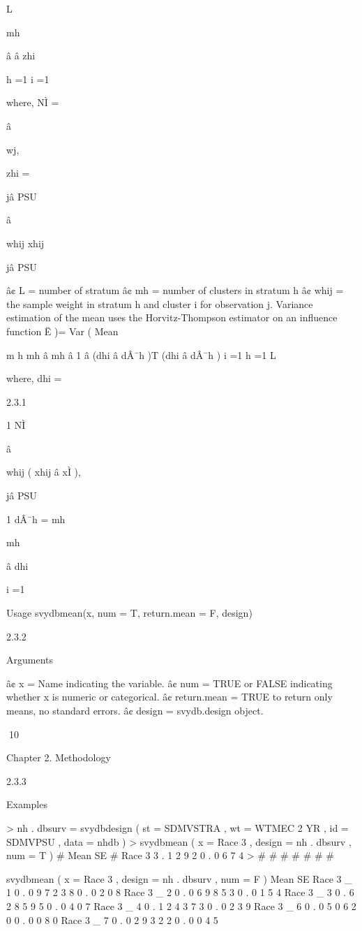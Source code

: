 L

mh

â â zhi

h =1 i =1

where,
NÌ =

â

wj,

zhi =

jâ PSU

â

whij xhij

jâ PSU

â¢ L = number of stratum
â¢ mh = number of clusters in stratum h
â¢ whij = the sample weight in stratum h and cluster i for observation j.
Variance estimation of the mean uses the Horvitz-Thompson estimator on an influence function
Ë )=
Var ( Mean

m h mh
â mh â 1 â (dhi â dÂ¯h )T (dhi â dÂ¯h )
i =1
h =1
L

where,
dhi =

2.3.1

1
NÌ

â

whij ( xhij â xÌ ),

jâ PSU

1
dÂ¯h =
mh

mh

â dhi

i =1

Usage
svydbmean(x, num = T, return.mean = F, design)

2.3.2

Arguments

â¢ x = Name indicating the variable.
â¢ num = TRUE or FALSE indicating whether x is numeric or categorical.
â¢ return.mean = TRUE to return only means, no standard errors.
â¢ design = svydb.design object.

10

Chapter 2. Methodology

2.3.3

Examples

> nh . dbsurv = svydbdesign ( st = SDMVSTRA , wt = WTMEC 2 YR ,
id = SDMVPSU , data = nhdb )
> svydbmean ( x = Race 3 , design = nh . dbsurv , num = T )
#
Mean
SE
# Race 3 3 . 1 2 9 2 0 . 0 6 7 4
>
#
#
#
#
#
#
#

svydbmean ( x = Race 3 , design = nh . dbsurv , num = F )
Mean
SE
Race 3 _ 1 0 . 0 9 7 2 3 8 0 . 0 2 0 8
Race 3 _ 2 0 . 0 6 9 8 5 3 0 . 0 1 5 4
Race 3 _ 3 0 . 6 2 8 5 9 5 0 . 0 4 0 7
Race 3 _ 4 0 . 1 2 4 3 7 3 0 . 0 2 3 9
Race 3 _ 6 0 . 0 5 0 6 2 0 0 . 0 0 8 0
Race 3 _ 7 0 . 0 2 9 3 2 2 0 . 0 0 4 5

